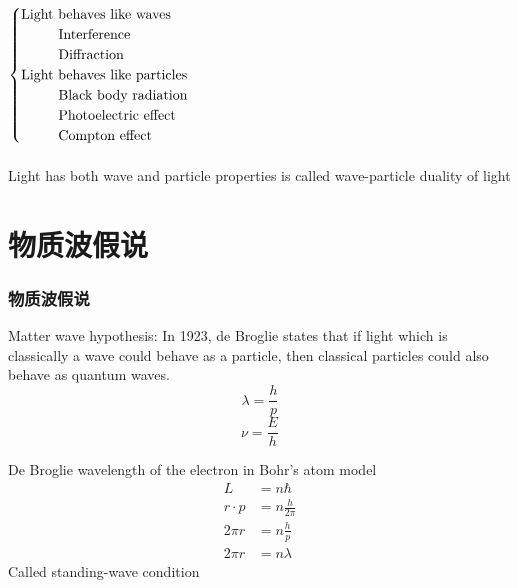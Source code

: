 \begin{frame}  
  $\begin{cases}
    \text{Light behaves like waves }\\
    \text{~~\qquad Interference} \\
    \text{~~\qquad Diffraction} \\
    \text{Light behaves like particles}\\
    \text{~~\qquad Black body radiation} \\
    \text{~~\qquad Photoelectric effect} \\
    \text{~~\qquad Compton effect} \\
   \end{cases}$\\
   ~~\\
   Light has both wave and particle properties is called \alert{wave-particle duality} of light
\end{frame}



\section{物质波假说}

\begin{frame}   
  \frametitle{物质波假说}
  \begin{tcolorbox1}{Matter wave hypothesis:}
  In 1923, de Broglie states that if light which is classically a wave could behave as a particle, 
  then classical particles could also behave as quantum waves.
  \[\lambda=\frac{h}{p}\]
  \[\nu =\frac{E}{h}\]
  \end{tcolorbox1}
\end{frame}

\begin{frame}  
    \frame{}
    De Broglie wavelength of the electron in Bohr's atom model
    \begin{equation*}
        \begin{split}
            L&=n\hbar \\
            r \cdot p & =  n\frac{h}{2 \pi} \\
            2\pi r&=  n\frac{h}{p}\\
            2\pi r&=  n\lambda 
        \end{split} 
     \end{equation*}
     Called standing-wave condition 
\end{frame}


